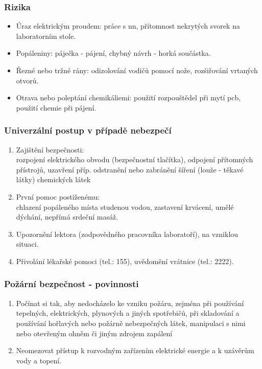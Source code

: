 \documentclass{beamer}
\begin{document}
	\begin{frame}
    \frametitle{Rizika}
		\begin{itemize}
		\item Úraz elektrickým proudem: práce s nn, přítomnost nekrytých svorek na laboratorním stole.
		\item Popáleniny: páječka - pájení, chybný návrh - horká součástka.
		\item Řezné nebo tržné rány: odizolování vodičů pomocí nože, rozšiřování vrtaných otvorů.
		\item Otrava nebo poleptání chemikáliemi: použití rozpouštědel při mytí pcb, použití chemie při pájení.
		\end{itemize}
	\end{frame}
	\begin{frame}
    \frametitle{Univerzální postup v případě nebezpečí}
		\begin{enumerate}
		\item Zajištění bezpečnosti:\\
		rozpojení elektrického obvodu (bezpečnostní tlačítka), odpojení přítomných přístrojů, uzavření příp. odstranění nebo zabránění šíření (louže - těkavé látky) chemických látek
		\item První pomoc postiženému:\\ chlazení popáleného místa studenou vodou, zastavení krvácení, umělé dýchání, nepřímá srdeční masáž.
		\item Upozornění lektora (zodpovědného pracovníka laboratoří), na vzniklou situaci.
		\item Přivolání lékařské pomoci (tel.: 155), uvědomění vrátnice (tel.: 2222).
		\end{enumerate}
	\end{frame}
	\begin{frame}
    \frametitle{Požární bezpečnost - povinnosti}
		\begin{enumerate}
		\item Počínat si tak, aby nedocházelo ke vzniku požáru, zejména při používání tepelných, elektrických, plynových a jiných spotřebičů, při skladování a používání hořlavých nebo požárně nebezpečných látek, manipulaci s nimi nebo otevřeným ohněm či jiným zdrojem zapálení
		\item Neomezovat přístup k rozvodným zařízením elektrické energie a k uzávěrům vody a topení.
		\end{enumerate}
	\end{frame}
\end{document}
